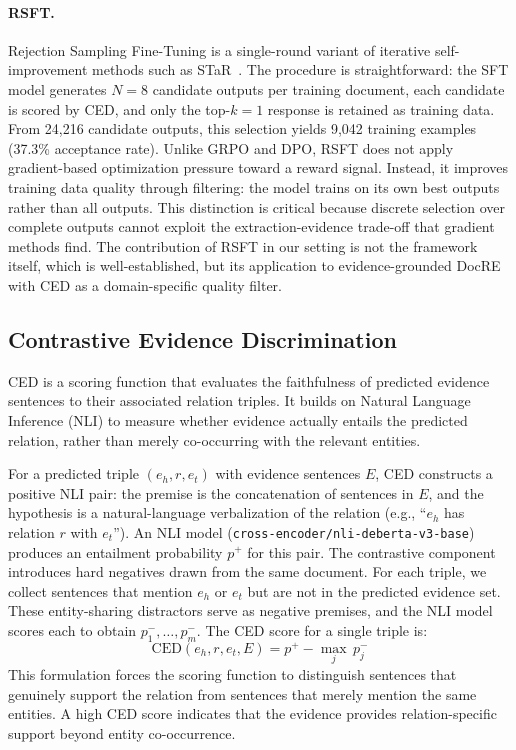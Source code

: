 \paragraph{RSFT.}
Rejection Sampling Fine-Tuning is a single-round variant of iterative self-improvement methods such as STaR~\citep{zelikman2022star}. The procedure is straightforward: the SFT model generates $N{=}8$ candidate outputs per training document, each candidate is scored by CED, and only the top-$k{=}1$ response is retained as training data. From 24,216 candidate outputs, this selection yields 9,042 training examples (37.3\% acceptance rate). Unlike GRPO and DPO, RSFT does not apply gradient-based optimization pressure toward a reward signal. Instead, it improves training data quality through filtering: the model trains on its own best outputs rather than all outputs. This distinction is critical because discrete selection over complete outputs cannot exploit the extraction-evidence trade-off that gradient methods find. The contribution of RSFT in our setting is not the framework itself, which is well-established, but its application to evidence-grounded DocRE with CED as a domain-specific quality filter.


\subsection{Contrastive Evidence Discrimination}
\label{sec:ced}

CED is a scoring function that evaluates the faithfulness of predicted evidence sentences to their associated relation triples. It builds on Natural Language Inference (NLI) to measure whether evidence actually entails the predicted relation, rather than merely co-occurring with the relevant entities.

For a predicted triple $(e_h, r, e_t)$ with evidence sentences $E$, CED constructs a positive NLI pair: the premise is the concatenation of sentences in $E$, and the hypothesis is a natural-language verbalization of the relation (e.g., ``$e_h$ has relation $r$ with $e_t$''). An NLI model (\texttt{cross-encoder/nli-deberta-v3-base}) produces an entailment probability $p^+$ for this pair. The contrastive component introduces hard negatives drawn from the same document. For each triple, we collect sentences that mention $e_h$ or $e_t$ but are not in the predicted evidence set. These entity-sharing distractors serve as negative premises, and the NLI model scores each to obtain $p^-_1, \ldots, p^-_m$. The CED score for a single triple is:
\begin{equation}
\text{CED}(e_h, r, e_t, E) = p^+ - \max_j \, p^-_j
\label{eq:ced}
\end{equation}
This formulation forces the scoring function to distinguish sentences that genuinely support the relation from sentences that merely mention the same entities. A high CED score indicates that the evidence provides relation-specific support beyond entity co-occurrence.

